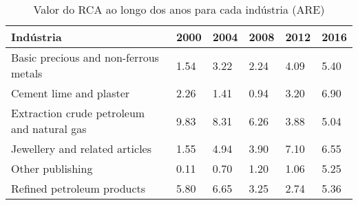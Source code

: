 \begin{table}
\centering
\caption{Valor do RCA ao longo dos anos para cada indústria (ARE)}
\begin{tabular}{p{6cm}p{1.5cm}p{1.5cm}p{1.5cm}p{1.5cm}p{1.5cm}}
\toprule
                                 Indústria & 2000 & 2004 & 2008 & 2012 & 2016 \\
\midrule
     Basic precious and non-ferrous metals & 1.54 & 3.22 & 2.24 & 4.09 & 5.40 \\
                   Cement lime and plaster & 2.26 & 1.41 & 0.94 & 3.20 & 6.90 \\
Extraction crude petroleum and natural gas & 9.83 & 8.31 & 6.26 & 3.88 & 5.04 \\
            Jewellery and related articles & 1.55 & 4.94 & 3.90 & 7.10 & 6.55 \\
                          Other publishing & 0.11 & 0.70 & 1.20 & 1.06 & 5.25 \\
                Refined petroleum products & 5.80 & 6.65 & 3.25 & 2.74 & 5.36 \\
\bottomrule
\end{tabular}
\end{table}
